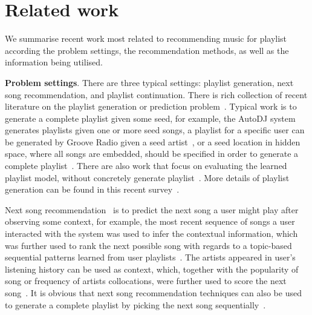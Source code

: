 \section{Related work}
\label{sec:related}


We summarise recent work most related to recommending music for playlist
according the problem settings, the recommendation methods,
as well as the information being utilised.


{\bf Problem settings}.
There are three typical settings:
playlist generation, next song recommendation, and playlist continuation.
%
There is rich collection of recent literature on the playlist generation or prediction
problem~\cite{platt2002learning,mcfee2011natural,mcfee2012hypergraph,chen2012playlist,ben2017groove}.
%
Typical work is to generate a complete playlist given some seed,
for example, the AutoDJ system~\cite{platt2002learning} generates playlists given one or more seed songs,
a playlist for a specific user can be generated by Groove Radio given a seed artist~\cite{ben2017groove},
or a seed location in hidden space, where all songs are embedded,
should be specified in order to generate a complete playlist~\cite{chen2012playlist}.
%
There are also work that focus on evaluating the learned playlist model,
without concretely generate playlist~\cite{mcfee2011natural,mcfee2012hypergraph}.
More details of playlist generation can be found in this recent survey~\cite{bonnin2015automated}.


Next song recommendation~\cite{hariri2012context,bonnin2013evaluating,jannach2015beyond}
is to predict the next song a user might play after observing some context,
for example, the most recent sequence of songs a user interacted with the system was used to
infer the contextual information, which was further used to rank the next possible song
with regards to a topic-based sequential patterns learned from user playlists~\cite{hariri2012context}.
%
The artists appeared in user's listening history can be used as context,
which, together with the popularity of song or frequency of artists collocations,
were further used to score the next song~\cite{mcfee2012million,bonnin2013evaluating}.
%
It is obvious that next song recommendation techniques can also be used to generate a
complete playlist by picking the next song sequentially~\cite{bonnin2013evaluating,ben2017groove}.



